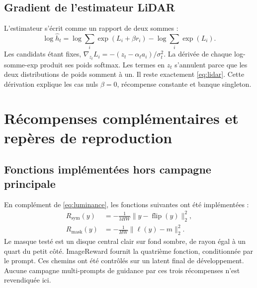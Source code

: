 \documentclass[11pt,a4paper]{article}
\begin{document}
\subsection{Gradient de l'estimateur LiDAR}
L'estimateur s'écrit comme un rapport de deux sommes :
\begin{equation}
\log\widehat h_t
=\log\sum_i\exp(L_i+\beta r_i)-\log\sum_i\exp(L_i).
\end{equation}
Les candidats étant fixes, $\nabla_{z_t}L_i=-(z_t-\alpha_ta_i)/\sigma_t^2$. La dérivée de chaque log-somme-exp produit ses poids softmax. Les termes en $z_t$ s'annulent parce que les deux distributions de poids somment à un. Il reste exactement \eqref{eq:lidar}. Cette dérivation explique les cas nuls $\beta=0$, récompense constante et banque singleton.

\section{Récompenses complémentaires et repères de reproduction}
\subsection{Fonctions implémentées hors campagne principale}
En complément de \eqref{eq:luminance}, les fonctions suivantes ont été implémentées :
\begin{align}
R_{\mathrm{sym}}(y)&=-\frac{1}{3HW}\lVert y-\operatorname{flip}(y)\rVert_2^2,\\
R_{\mathrm{mask}}(y)&=-\frac{1}{HW}\lVert\ell(y)-m\rVert_2^2.
\end{align}
Le masque testé est un disque central clair sur fond sombre, de rayon égal à un quart du petit côté. ImageReward fournit la quatrième fonction, conditionnée par le prompt. Ces chemins ont été contrôlés sur un latent final de développement. Aucune campagne multi-prompts de guidance par ces trois récompenses n'est revendiquée ici.
\end{document}
